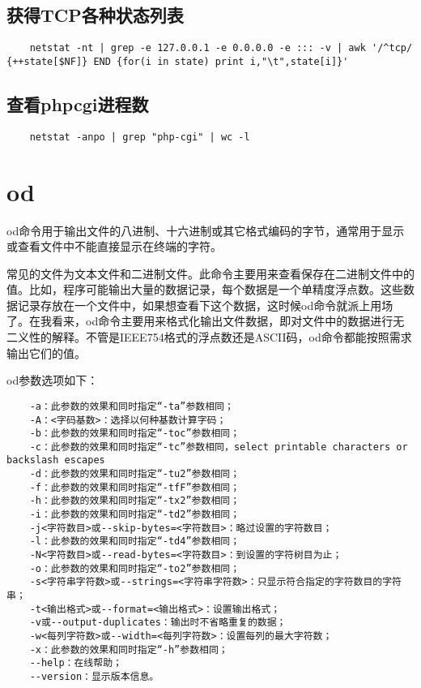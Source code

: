 \documentclass[a4paper,left=2.5cm,right=2.5cm,11pt]{article}
\begin{document}
\subsection{获得TCP各种状态列表}
	\begin{lstlisting}
	netstat -nt | grep -e 127.0.0.1 -e 0.0.0.0 -e ::: -v | awk '/^tcp/ {++state[$NF]} END {for(i in state) print i,"\t",state[i]}'
	\end{lstlisting}

\subsection{查看phpcgi进程数}
	\begin{lstlisting}
	netstat -anpo | grep "php-cgi" | wc -l
	\end{lstlisting}

\section{od}
	od命令用于输出文件的八进制、十六进制或其它格式编码的字节，通常用于显示或查看文件中不能直接显示在终端的字符。\par
	常见的文件为文本文件和二进制文件。此命令主要用来查看保存在二进制文件中的值。比如，程序可能输出大量的数据记录，每个数据是一个单精度浮点数。这些数据记录存放在一个文件中，如果想查看下这个数据，这时候od命令就派上用场了。在我看来，od命令主要用来格式化输出文件数据，即对文件中的数据进行无二义性的解释。不管是IEEE754格式的浮点数还是ASCII码，od命令都能按照需求输出它们的值。\par

	od参数选项如下：
	\begin{lstlisting}
	-a：此参数的效果和同时指定“-ta”参数相同； 
	-A：<字码基数>：选择以何种基数计算字码； 
	-b：此参数的效果和同时指定“-toc”参数相同； 
	-c：此参数的效果和同时指定“-tc”参数相同，select printable characters or backslash escapes 
	-d：此参数的效果和同时指定“-tu2”参数相同； 
	-f：此参数的效果和同时指定“-tfF”参数相同； 
	-h：此参数的效果和同时指定“-tx2”参数相同； 
	-i：此参数的效果和同时指定“-td2”参数相同； 
	-j<字符数目>或--skip-bytes=<字符数目>：略过设置的字符数目； 
	-l：此参数的效果和同时指定“-td4”参数相同； 
	-N<字符数目>或--read-bytes=<字符数目>：到设置的字符树目为止； 
	-o：此参数的效果和同时指定“-to2”参数相同； 
	-s<字符串字符数>或--strings=<字符串字符数>：只显示符合指定的字符数目的字符串； 
	-t<输出格式>或--format=<输出格式>：设置输出格式； 
	-v或--output-duplicates：输出时不省略重复的数据； 
	-w<每列字符数>或--width=<每列字符数>：设置每列的最大字符数； 
	-x：此参数的效果和同时指定“-h”参数相同； 
	--help：在线帮助； 
	--version：显示版本信息。
	\end{lstlisting}
\end{document}
